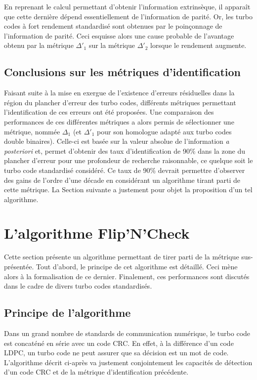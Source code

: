 En reprenant le calcul permettant d'obtenir l'information extrinsèque, il apparaît que cette dernière dépend essentiellement
de l'information de parité. Or, les turbo codes à fort rendement standardisé sont obtenues par le poinçonnage de l'information
de parité. Ceci esquisse alors une cause probable de l'avantage obtenu par la métrique $\Delta'_1$ sur la métrique $\Delta'_2$
lorsque le rendement augmente.

\subsection{Conclusions sur les métriques d'identification}
Faisant suite à la mise en exergue de l'existence d'erreurs résiduelles dans la région du plancher d'erreur des turbo codes,
différents métriques permettant l'identification de ces erreurs ont été proposées. Une comparaison des performances de ces 
différentes métriques a alors permis de sélectionner une métrique, nommée $\Delta_1$ (et $\Delta'_1$ pour son homologue 
adapté aux turbo codes double binaires). Celle-ci est basée sur la valeur absolue de l'information \textit{a posteriori}
et, permet d'obtenir des taux d'identification de 90\% dans la zone du plancher d'erreur pour une profondeur de recherche 
raisonnable, ce quelque soit le turbo code standardisé considéré. Ce taux de 90\% devrait permettre d'observer des gains 
de l'ordre d'une décade en considérant un algorithme tirant parti de cette métrique. La Section suivante a justement pour 
objet la proposition d'un tel algorithme.

\section{L'algorithme Flip'N'Check}
Cette section présente un algorithme permettant de tirer parti de la métrique sus-présentée. Tout d'abord, le 
principe de cet algorithme est détaillé. Ceci mène alors à la formalisation de ce dernier. Finalement, ces performances 
sont discutés dans le cadre de divers turbo codes standardisés.

\subsection{Principe de l'algorithme}
Dans un grand nombre de standards de communication numérique, le turbo code est concaténé en série avec un code CRC. En 
effet, à la différence d'un code LDPC, un turbo code ne peut assurer que sa décision est un mot de code. L'algorithme 
décrit ci-après va justement conjointement les capacités de détection d'un code CRC et de la métrique d'identification
précédente. 


